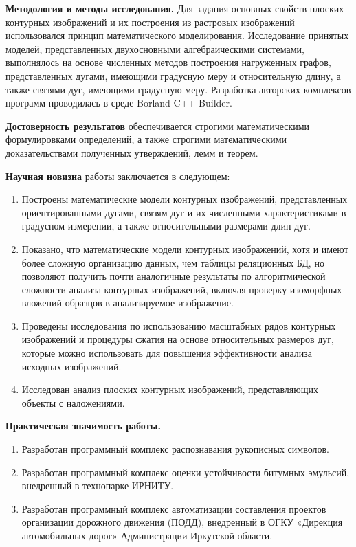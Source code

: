 \textbf{Методология и методы исследования.} Для задания основных свойств  плоских контурных изображений и их построения из растровых изображений использовался  принцип математического моделирования. Исследование принятых моделей, представленных двухосновными алгебраическими системами, выполнялось на основе численных методов построения нагруженных графов, представленных дугами, имеющими градусную меру и относительную длину, а также связями дуг, имеющими градусную меру. Разработка авторских комплексов программ проводилась в среде Borland C++ Builder. 

\textbf{Достоверность результатов} обеспечивается строгими математическими формулировками определений, а также строгими математическими доказательствами полученных утверждений, лемм и теорем.

\textbf{Научная новизна} работы заключается в следующем: 
\begin{enumerate}
\item Построены математические модели контурных изображений, представленных ориентированными дугами, связям дуг и их численными характеристиками в градусном измерении,  а также  относительными размерами  длин дуг.  
\item Показано, что математические модели контурных изображений, хотя и имеют более сложную организацию данных, чем  таблицы реляционных БД, но позволяют получить почти аналогичные результаты по алгоритмической сложности  анализа контурных изображений, включая проверку изоморфных вложений образцов в анализируемое изображение.
\item Проведены исследования по использованию масштабных рядов контурных изображений и процедуры сжатия на  основе относительных размеров дуг, которые можно использовать для повышения эффективности анализа исходных изображений.
\item Исследован анализ плоских контурных изображений, представляющих объекты с наложениями.
\end{enumerate}

\noindent
\textbf{Практическая значимость работы.}
\begin{enumerate}
\item  Разработан  программный комплекс распознавания рукописных символов.
\item  Разработан  программный комплекс оценки устойчивости битумных эмульсий, внедренный в технопарке  ИРНИТУ.
\item  Разработан  программный комплекс автоматизации составления проектов организации дорожного движения (ПОДД), внедренный в ОГКУ «Дирекция автомобильных дорог» Администрации Иркутской области.
\end{enumerate}

